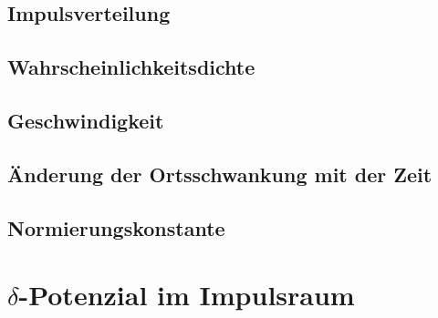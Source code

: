 \subsection{Impulsverteilung}

\subsection{Wahrscheinlichkeitsdichte}

\subsection{Geschwindigkeit}

\subsection{Änderung der Ortsschwankung mit der Zeit}

\subsection{Normierungskonstante}

\section{$\delta$-Potenzial im Impulsraum}


